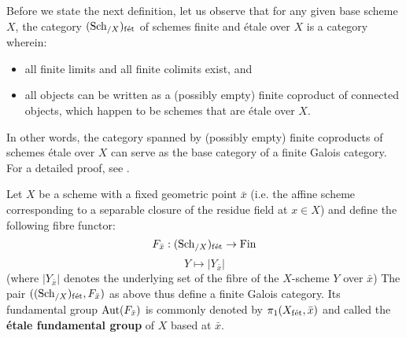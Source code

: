        Before we state the next definition, let us observe that for any given base scheme $X$, the category $(\mathrm{Sch}_{/X})_{\mathrm{f\acute{e}t}}$ of schemes finite and \'etale over $X$ is a category wherein:
            \begin{itemize}
                \item all finite limits and all finite colimits exist, and
                \item all objects can be written as a (possibly empty) finite coproduct of connected objects, which happen to be schemes that are \'etale over $X$.  
            \end{itemize}
        In other words, the category spanned by (possibly empty) finite coproducts of schemes \'etale over $X$ can serve as the base category of a finite Galois category. For a detailed proof, see \cite[\href{https://stacks.math.columbia.edu/tag/0BN9}{Tag 0BN9}]{stacks}. 
        \begin{definition} \label{def: etale_fundamental_groups}
            Let $X$ be a scheme with a fixed geometric point $\bar{x}$ (i.e. the affine scheme corresponding to a separable closure of the residue field at $x \in X$) and define the following fibre functor:
                $$F_{\bar{x}}: (\mathrm{Sch}_{/X})_{\mathrm{f\acute{e}t}} \to \mathrm{Fin}$$
                $$Y \mapsto |Y_{\bar{x}}|$$
            (where $|Y_{\bar{x}}|$ denotes the underlying set of the fibre of the $X$-scheme $Y$ over $\bar{x}$) The pair $((\mathrm{Sch}_{/X})_{\mathrm{f\acute{e}t}}, F_{\bar{x}})$ as above thus define a finite Galois category. Its fundamental group $\mathrm{Aut}(F_{\bar{x}})$ is commonly denoted by $\pi_1(X_{\mathrm{f\acute{e}t}}, \bar{x})$ and called the \textbf{\'etale fundamental group} of $X$ based at $\bar{x}$.
        \end{definition}
